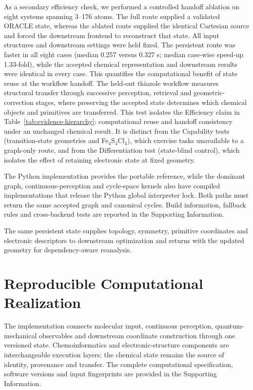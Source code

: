 \documentclass[journal=jctcce,manuscript=article]{achemso}
\newcommand{\rev}[1]{#1}
\begin{document}
As a secondary efficiency check, we performed a controlled handoff ablation on eight systems
spanning 3--176 atoms.  The full route supplied a validated ORACLE state,
whereas the ablated route supplied the identical Cartesian source and
forced the downstream frontend to reconstruct that state.  All input
structures and downstream settings were held fixed.  The persistent route was
faster in all eight cases (median 0.257 versus 0.327 s; median case-wise
speed-up 1.33-fold), while the accepted chemical representation and downstream
results were identical in every case.  This quantifies the computational
benefit of state reuse at the workflow handoff.  The held-out thiazole workflow
measures structural transfer through successive perception, retrieval and
geometric-correction stages, where preserving the accepted state determines
which chemical objects and primitives are transferred.
This test isolates the Efficiency claim in Table~\ref{tab:evidence-hierarchy}:
computational reuse and handoff consistency under an unchanged chemical
result.  It is distinct from the Capability tests (transition-state geometries and
Fe$_4$S$_4$Cl$_4$), which exercise tasks unavailable to a graph-only route, and
from the Differentiation test (state-blind control), which isolates the effect
of retaining electronic state at fixed geometry.

The Python implementation provides the portable reference, while the
dominant graph, continuous-perception and cycle-space kernels also have
compiled implementations that release the Python global interpreter lock.
Both paths must return the same accepted graph and canonical cycles.  Build
information, fallback rules and cross-backend tests are reported in the
Supporting Information.

\rev{The same persistent state supplies topology, symmetry, primitive coordinates
and electronic descriptors to downstream optimization and returns with the
updated geometry for dependency-aware reanalysis.}

\section{Reproducible Computational Realization}
\label{sec:computational-details}

The implementation connects molecular input, continuous perception, quantum-
mechanical observables and downstream coordinate construction through one
versioned state.  Chemoinformatics and electronic-structure components are
interchangeable execution layers; the chemical state remains the source of
identity, provenance and transfer.  The complete computational specification,
software versions and input fingerprints are provided in the Supporting
Information.
\end{document}
